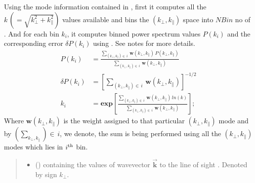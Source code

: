 \documentclass[a4paper,11pt,oneside,english,openany]{sphinxmanual}
\begin{document}
\begin{fulllineitems}
\label{\detokenize{psestimation:psestimation.binned_pk}}
\pysigstartsignatures
{}
\pysigstopsignatures
\sphinxAtStartPar
Using the mode information contained in , first it computes all the \(k\,(={ \sqrt{k_{\perp}^2+k_{\parallel}^2}})\) values available and bins the \((k_{\perp},k_{\parallel})\) space into \(N\!Bin\) no of . And for each bin \(k_i\), it computes binned power spectrum values \(P(k_i)\) and the corresponding error \(\delta P(k_i)\) using . See notes for more details.
\begin{equation*}
\begin{split}P(k_i) &= \frac{\sum_{(k_\perp,k_\parallel)\in\, i}\,\mathbf{w}(k_{\perp},k_{\parallel})\,P(k_{\perp},k_{\parallel})}{\sum_{(k_\perp,k_\parallel)\in\, i}\,\mathbf{w}(k_{\perp},k_{\parallel})}\\[0.5em]
\delta P(k_i) &= \left[{\sum_{(k_\perp,k_\parallel)\in\, i}\,\mathbf{w}(k_{\perp},k_{\parallel})}\right]^{-1/2}\\[0.5em]
k_i &= \mathbf{exp}\left[\frac{\sum_{(k_\perp,k_\parallel)\in\, i}\,\mathbf{{{w}}}(k_{\perp},k_{\parallel})\,ln(k)}{\sum_{(k_\perp,k_\parallel)\in\, i}\,\mathbf{{{w}}}(k_{\perp},k_{\parallel})}\right];\end{split}
\end{equation*}
\sphinxAtStartPar
Where \(\mathbf{w}(k_{\perp},k_{\parallel})\) is the weight assigned to that particular \((k_{\perp},k_{\parallel})\) mode and by  \((\sum_{k_\perp,k_\parallel})\in \, i\), we denote, the sum is being performed using all the \((k_{\perp},k_{\parallel})\) modes which lies in \(i^{\rm th}\) bin.
\begin{quote}\begin{description}
\begin{itemize}
\item {} 
\sphinxAtStartPar
{} () \textendash{}  containing the values of wave\sphinxhyphen{}vector \(\vec{\mathbf{k}}\)  to the line of sight . Denoted by sign \(k_{\perp}\).


\end{itemize}
\end{description}
\end{quote}
\end{fulllineitems}
\end{document}
